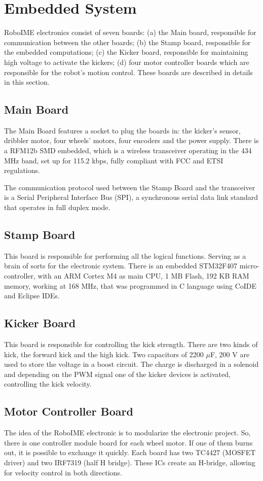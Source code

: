 \section{Embedded System}\label{emb_sys_sec}
RoboIME electronics consist of seven boards: (a) the Main board, responsible for communication between the other boards; (b) the Stamp board, responsible for the embedded computations; (c) the Kicker board, responsible for maintaining high voltage to activate the kickers; (d) four motor controller boards which are responsible for the robot's motion control. These boards are described in details in this section.

\subsection{Main Board}
The Main Board features a socket to plug the boards in: the kicker's sensor, dribbler motor, four wheels' motors, four encoders and the power supply. There is a RFM12b SMD embedded, which is a wireless transceiver operating in the 434 MHz band, set up for 115.2 kbps, fully compliant with FCC and ETSI regulations.

The communication protocol used between the Stamp Board and the transceiver is a Serial Peripheral Interface Bus (SPI), a synchronous serial data link standard that operates in full duplex mode.

\subsection{Stamp Board}
This board is responsible  for performing all the logical functions. Serving as a brain of sorts for the electronic system. There is an embedded STM32F407 micro-controller, with an ARM Cortex M4 as main CPU, 1 MB Flash, 192 KB RAM memory, working at 168 MHz, that was programmed in C language using CoIDE and Eclipse IDEs.

\subsection{Kicker Board}
This board is responsible for controlling the kick strength. There are two kinds of kick, the forward kick and the high kick. Two capacitors of 2200 $\mu$F, 200 V are used to store the voltage in a boost circuit. The charge is discharged in a solenoid and depending on the PWM signal one of the kicker devices is activated, controlling the kick velocity.


\subsection{Motor Controller Board}
The idea of the RoboIME electronic is to modularize the electronic project. So, there is one controller module board for each wheel motor. If one of them burns out, it is possible to exchange it quickly. Each board has two TC4427 (MOSFET driver) and two IRF7319 (half H bridge). These ICs create an H-bridge, allowing for velocity control in both directions.
